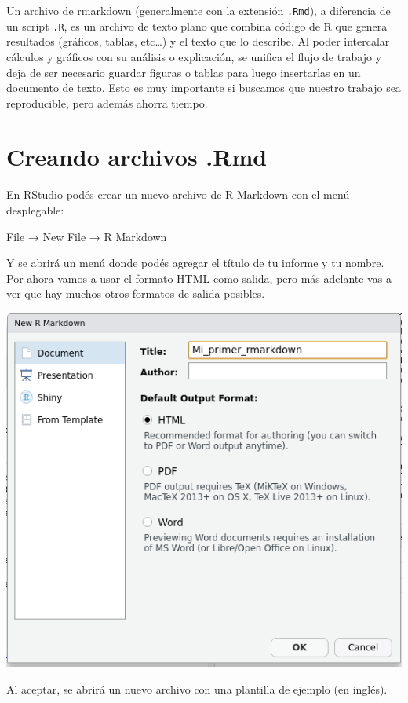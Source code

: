 \documentclass[
  openany]{book}
\begin{document}
Un archivo de rmarkdown (generalmente con la extensión \texttt{.Rmd}), a diferencia de un script \texttt{.R}, es un archivo de texto plano que combina código de R que genera resultados (gráficos, tablas, etc\ldots) y el texto que lo describe.
Al poder intercalar cálculos y gráficos con su análisis o explicación, se unifica el flujo de trabajo y deja de ser necesario guardar figuras o tablas para luego insertarlas en un documento de texto.
Esto es muy importante si buscamos que nuestro trabajo sea reproducible, pero además ahorra tiempo.

\hypertarget{creando-archivos-.rmd}{%
\section{Creando archivos .Rmd}\label{creando-archivos-.rmd}}

En RStudio podés crear un nuevo archivo de R Markdown con el menú desplegable:

File → New File → R Markdown

Y se abrirá un menú donde podés agregar el título de tu informe y tu nombre.
Por ahora vamos a usar el formato HTML como salida, pero más adelante vas a ver que hay muchos otros formatos de salida posibles.

\includegraphics{img/nuevo-rmd.png}

Al aceptar, se abrirá un nuevo archivo con una plantilla de ejemplo (en inglés).
\end{document}
